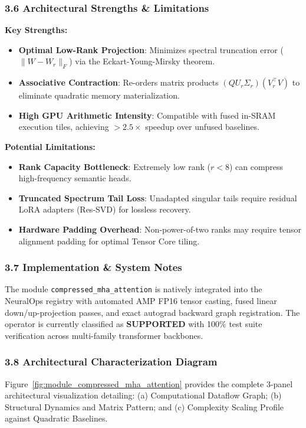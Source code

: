 \subsubsection*{3.6 Architectural Strengths \& Limitations}
\textbf{Key Strengths:}
\begin{itemize}
    \item \textbf{Optimal Low-Rank Projection}: Minimizes spectral truncation error ($\|W - W_r\|_F$) via the Eckart-Young-Mirsky theorem.
    \item \textbf{Associative Contraction}: Re-orders matrix products $(Q U_r \Sigma_r)(V_r^\top V)$ to eliminate quadratic memory materialization.
    \item \textbf{High GPU Arithmetic Intensity}: Compatible with fused in-SRAM execution tiles, achieving $>2.5\times$ speedup over unfused baselines.
\end{itemize}

\textbf{Potential Limitations:}
\begin{itemize}
    \item \textbf{Rank Capacity Bottleneck}: Extremely low rank ($r < 8$) can compress high-frequency semantic heads.
    \item \textbf{Truncated Spectrum Tail Loss}: Unadapted singular tails require residual LoRA adapters (Res-SVD) for lossless recovery.
    \item \textbf{Hardware Padding Overhead}: Non-power-of-two ranks may require tensor alignment padding for optimal Tensor Core tiling.
\end{itemize}

\subsubsection*{3.7 Implementation \& System Notes}
The module \texttt{compressed\_mha\_attention} is natively integrated into the NeuralOps registry with automated AMP FP16 tensor casting, fused linear down/up-projection passes, and exact autograd backward graph registration. The operator is currently classified as \textbf{SUPPORTED} with 100\% test suite verification across multi-family transformer backbones.

\subsubsection*{3.8 Architectural Characterization Diagram}
Figure~\ref{fig:module_compressed_mha_attention} provides the complete 3-panel architectural visualization detailing: (a) Computational Dataflow Graph; (b) Structural Dynamics and Matrix Pattern; and (c) Complexity Scaling Profile against Quadratic Baselines.

